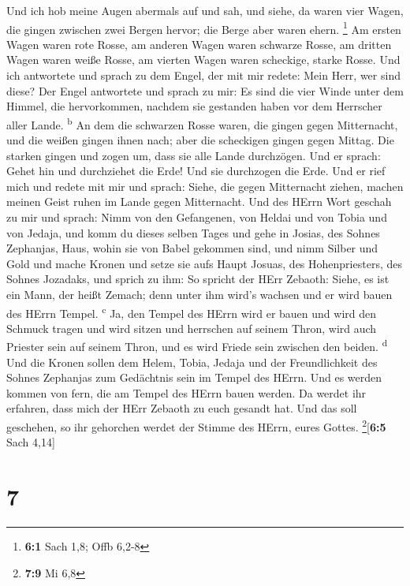  Und ich hob meine Augen abermals auf und sah, und siehe,
da waren vier Wagen, die gingen zwischen zwei Bergen hervor; die Berge
aber waren ehern. \footnote{\textbf{6:1} Sach 1,8; Offb 6,2-8}
 Am ersten Wagen waren rote Rosse, am anderen Wagen waren
schwarze Rosse,  am dritten Wagen waren weiße Rosse, am
vierten Wagen waren scheckige, starke Rosse.  Und ich
antwortete und sprach zu dem Engel, der mit mir redete: Mein Herr, wer
sind diese?  Der Engel antwortete und sprach zu mir: Es
sind die vier Winde unter dem Himmel, die hervorkommen, nachdem sie
gestanden haben vor dem Herrscher aller Lande. \textsuperscript{b}
 An dem die schwarzen Rosse waren, die gingen gegen
Mitternacht, und die weißen gingen ihnen nach; aber die scheckigen
gingen gegen Mittag.  Die starken gingen und zogen um,
dass sie alle Lande durchzögen. Und er sprach: Gehet hin und durchziehet
die Erde! Und sie durchzogen die Erde.  Und er rief mich
und redete mit mir und sprach: Siehe, die gegen Mitternacht ziehen,
machen meinen Geist ruhen im Lande gegen Mitternacht.  Und
des HErrn Wort geschah zu mir und sprach:  Nimm von den
Gefangenen, von Heldai und von Tobia und von Jedaja, und komm du dieses
selben Tages und gehe in Josias, des Sohnes Zephanjas, Haus, wohin sie
von Babel gekommen sind,  und nimm Silber und Gold und
mache Kronen und setze sie aufs Haupt Josuas, des Hohenpriesters, des
Sohnes Jozadaks,  und sprich zu ihm: So spricht der HErr
Zebaoth: Siehe, es ist ein Mann, der heißt Zemach; denn unter ihm wird's
wachsen und er wird bauen des HErrn Tempel. \textsuperscript{c}
 Ja, den Tempel des HErrn wird er bauen und wird den
Schmuck tragen und wird sitzen und herrschen auf seinem Thron, wird auch
Priester sein auf seinem Thron, und es wird Friede sein zwischen den
beiden. \textsuperscript{d}  Und die Kronen sollen dem
Helem, Tobia, Jedaja und der Freundlichkeit des Sohnes Zephanjas zum
Gedächtnis sein im Tempel des HErrn.  Und es werden
kommen von fern, die am Tempel des HErrn bauen werden. Da werdet ihr
erfahren, dass mich der HErr Zebaoth zu euch gesandt hat. Und das soll
geschehen, so ihr gehorchen werdet der Stimme des HErrn, eures Gottes.
\footnote{\textbf{7:9} Mi 6,8}{[}\textbf{6:5} Sach 4,14{]}

\hypertarget{section-6}{%
\section{7}\label{section-6}}

